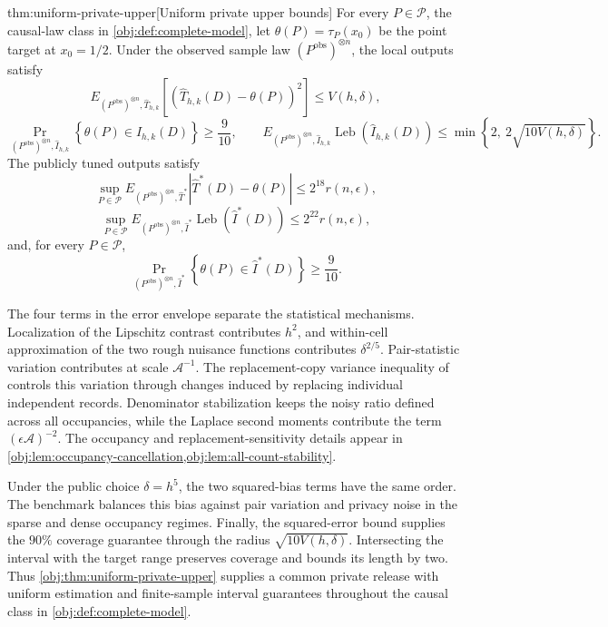 \begin{theoremv}{thm:uniform-private-upper}[Uniform private upper bounds]
For every \(P\in\mathcal P\), the causal-law class in
\cref{obj:def:complete-model}, let \(\theta(P)=\tau_P(x_0)\) be the point
target at \(x_0=1/2\). Under the observed sample law
\((P^{\mathrm{obs}})^{\otimes n}\), the local outputs satisfy
\[
E_{(P^{\mathrm{obs}})^{\otimes n},\widehat T_{h,k}}
\left[(\widehat T_{h,k}(D)-\theta(P))^2\right]
\le V(h,\delta),
\]
\[
\Pr_{(P^{\mathrm{obs}})^{\otimes n},\widehat I_{h,k}}
\left\{\theta(P)\in\widehat I_{h,k}(D)\right\}
\ge\frac9{10},
\qquad
E_{(P^{\mathrm{obs}})^{\otimes n},\widehat I_{h,k}}
\operatorname{Leb}(\widehat I_{h,k}(D))
\le\min\left\{2,\ 2\sqrt{10V(h,\delta)}\right\}.
\]
The publicly tuned outputs satisfy
\[
\sup_{P\in\mathcal P}
E_{(P^{\mathrm{obs}})^{\otimes n},\widehat T^*}
\left|\widehat T^*(D)-\theta(P)\right|
\le2^{18}r(n,\epsilon),
\]
\[
\sup_{P\in\mathcal P}
E_{(P^{\mathrm{obs}})^{\otimes n},\widehat I^*}
\operatorname{Leb}(\widehat I^*(D))
\le2^{22}r(n,\epsilon),
\]
and, for every \(P\in\mathcal P\),
\[
\Pr_{(P^{\mathrm{obs}})^{\otimes n},\widehat I^*}
\left\{\theta(P)\in\widehat I^*(D)\right\}
\ge\frac9{10}.
\]
\end{theoremv}

The four terms in the error envelope separate the statistical mechanisms. Localization of the Lipschitz contrast contributes \(h^2\), and within-cell approximation of the two rough nuisance functions contributes \(\delta^{2/5}\). Pair-statistic variation contributes at scale \(\mathcal A^{-1}\). The replacement-copy variance inequality of \citet[Theorem 3.1, replacement-copy form, p.~54]{BoucheronLugosiMassart2013} controls this variation through changes induced by replacing individual independent records. Denominator stabilization keeps the noisy ratio defined across all occupancies, while the Laplace second moments contribute the term \((\epsilon\mathcal A)^{-2}\). The occupancy and replacement-sensitivity details appear in \cref{obj:lem:occupancy-cancellation,obj:lem:all-count-stability}.

Under the public choice \(\delta=h^5\), the two squared-bias terms have the same order. The benchmark balances this bias against pair variation and privacy noise in the sparse and dense occupancy regimes. Finally, the squared-error bound supplies the \(90\%\) coverage guarantee through the radius \(\sqrt{10V(h,\delta)}\). Intersecting the interval with the target range preserves coverage and bounds its length by two. Thus \cref{obj:thm:uniform-private-upper} supplies a common private release with uniform estimation and finite-sample interval guarantees throughout the causal class in \cref{obj:def:complete-model}.
